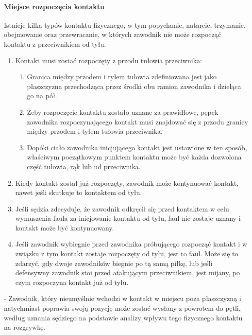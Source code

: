 \documentclass[12pt]{article}
\newcommand\other{\bgroup\color{green}\markoverwith{\textcolor{green}{\rule[-0.5ex]{2pt}{0.4pt}}}\ULon}
\begin{document}
\paragraph{Miejsce rozpoczęcia kontaktu}
Istnieje kilka typów
kontaktu fizycznego, w tym popychanie, natarcie, trzymanie, obejmowanie
oraz przewracanie, w których zawodnik nie może rozpocząć kontaktu z
przeciwnikiem od tyłu.

\begin{enumerate}
	\item
	      Kontakt musi zostać rozpoczęty z przodu tułowia przeciwnika:

	      \begin{enumerate}
		      \item
		            Granica między przodem i tyłem tułowia zdefiniowana jest jako
		            płaszczyzna przechodząca przez środki obu ramion zawodnika i
		            dzieląca go na pół.
		      \item
		            Żeby rozpoczęcie kontaktu zostało uznane za prawidłowe, pępek
		            zawodnika rozpoczynającego kontakt musi znajdować się z przodu
		            granicy między przodem i tyłem tułowia przeciwnika.
		      \item
		            Dopóki ciało zawodnika inicjującego kontakt jest ustawione w ten
		            sposób, właściwym początkowym punktem kontaktu może być każda
		            dozwolona część tułowia, rąk lub ud przeciwnika.
	      \end{enumerate}
	\item
	      Kiedy kontakt został już rozpoczęty, zawodnik może kontynuować
	      kontakt, nawet jeśli skutkuje to kontaktem od tyłu.
	\item
	      Jeśli sędzia zdecyduje, że zawodnik odkręcił się przed kontaktem w
	      celu wymuszenia faula za inicjowanie kontaktu od tyłu, faul nie
	      zostaje uznany i kontakt może być kontynuowany.
	\item
	      Jeśli zawodnik wybiegnie przed zawodnika próbującego rozpocząć kontakt
	      i w związku z tym kontakt zostaje rozpoczęty od tyłu, jest to faul.
	      Może się to zdarzyć, gdy dwoje zawodników biegnie po tą samą piłkę,
	      lub jeśli defensywny zawodnik stoi przed atakującym przeciwnikiem,
	      jest mijany, po czym rozpoczyna kontakt już od tyłu.
\end{enumerate}

\other{Powrót do pętli} - Zawodnik, który nieumyślnie wchodzi w kontakt w
miejscu poza płaszczyzną i natychmiast poprawia swoją pozycję może
zostać wysłany z powrotem do pętli, według uznania sędziego na podstawie
analizy wpływu tego fizycznego kontaktu na rozgrywkę.
\end{document}
